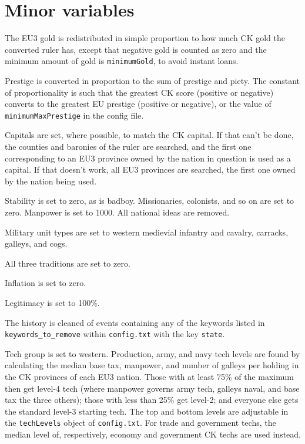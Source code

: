 \documentclass[12pt,ebook,oneside]{book}
\begin{document}
\section{Minor variables}

The EU3 gold is redistributed in simple proportion to
how much CK gold the converted ruler has, except that 
negative gold is counted as zero and the minimum amount
of gold is \verb|minimumGold|, to avoid instant loans. 

Prestige is converted in proportion to the sum of prestige and
piety. The constant of proportionality is such that the greatest
CK score (positive or negative) converts to the greatest EU prestige
(positive or negative), or the value of \verb|minimumMaxPrestige| in
the config file. 

Capitals are set, where possible, to match the CK capital. If that
can't be done, the counties and baronies of the ruler are searched,
and the first one corresponding to an EU3 province owned by the nation
in question is used as a capital. If that doesn't work, all EU3
provinces are searched, the first one owned by the nation being used. 

Stability is set to zero, as is badboy. Missionaries, colonists, and
so on are set to zero. Manpower is set to 1000. All national ideas are
removed. 

Military unit types are set to western medievial infantry and cavalry,
carracks, galleys, and cogs. 

All three traditions are set to zero. 

Inflation is set to zero. 

Legitimacy is set to 100\%. 

The history is cleaned of
events containing any of the keywords listed in
\verb|keywords_to_remove|
within \verb|config.txt| with the key \verb|state|. 

Tech group is set to western. Production, army, and navy tech levels are found by calculating the
median base tax, manpower, and number of galleys per holding in the CK provinces
of each EU3 nation. Those with at least 75\% of the maximum then get level-4 tech (where
manpower governs army tech, galleys naval, and base tax the three
others); those with less than 25\% get level-2; and everyone else gets the
standard level-3 starting tech. The top and bottom levels are
adjustable in the \verb|techLevels| object of \verb|config.txt|. For
trade and government techs, the median level of, respectively, economy
and government CK techs are used instead. 
\end{document}

